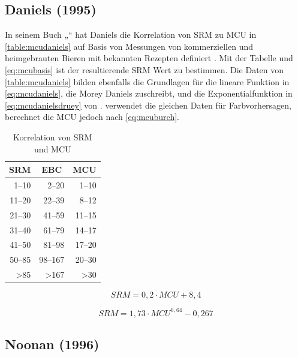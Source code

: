 \documentclass[a4paper,parskip=half]{scrartcl}
\newcommand{\MCUL}{\mathit{MCU}}
\newcommand{\SRM}{\mathit{SRM}}
\begin{document}
\subsection*{Daniels (1995)}

In seinem Buch „“ hat Daniels die Korrelation von SRM zu MCU in \autoref{table:mcudaniels} auf Basis von Messungen von kommerziellen und heimgebrauten Bieren mit bekannten Rezepten definiert \parencite[59]{Daniels1996}. Mit der Tabelle und \autoref{eq:mcubasis} ist der resultierende SRM Wert zu bestimmen. Die Daten von \autoref{table:mcudaniels} bilden ebenfalls die Grundlagen für die lineare Funktion in \autoref{eq:mcudaniels}, die Morey Daniels zuschreibt, und die Exponentialfunktion in \autoref{eq:mcudanielsdruey} von \textcite{Druey1998}. \textcite[10]{Holle2010} verwendet die gleichen Daten für Farbvorhersagen, berechnet die MCU jedoch nach \autoref{eq:mcuburch}.

\begin{table}[H]
\centering
\begin{tabular}{rrr}
\toprule
\multicolumn{1}{c}{\textbf{SRM}} & \multicolumn{1}{c}{\textbf{EBC}} & \multicolumn{1}{c}{\textbf{MCU}} \\
\midrule
1–10 & 2–20 & 1–10 \\
11–20 & 22–39 & 8–12 \\
21–30 & 41–59 & 11–15 \\
31–40 & 61–79 & 14–17 \\
41–50 & 81–98 & 17–20 \\
50–85 & 98–167 & 20–30 \\
>85 & >167 & >30 \\
\bottomrule
\end{tabular}
\caption{Korrelation von SRM und MCU \parencite[61]{Daniels1996}}
\label{table:mcudaniels}
\end{table}

\begin{equation}
\SRM = 0,2 \cdot \MCUL + 8,4
\label{eq:mcudaniels}
\end{equation}

\begin{equation}
\SRM = 1,73 \cdot \MCUL^{0,64} - 0,267
\label{eq:mcudanielsdruey}
\end{equation}

\subsection*{Noonan (1996)}
\end{document}
